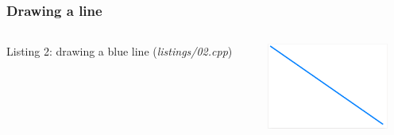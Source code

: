 \documentclass[aspectratio=169]{beamer}
\begin{document}
\begin{frame}[fragile]
\frametitle{Drawing a line}
\begin{columns}
  \begin{column}{0.7\textwidth}
    {\TINY
    
    \vspace{-12pt}
    }
    {\tiny \null\hfill{}Listing 2: drawing a blue line (\textit{listings/02.cpp})}
  \end{column}
  \begin{column}{0.3\textwidth}
    \includegraphics[width=4cm,keepaspectratio]{pics/output_02_line.png}
  \end{column}
\end{columns}
\end{frame}
\end{document}
